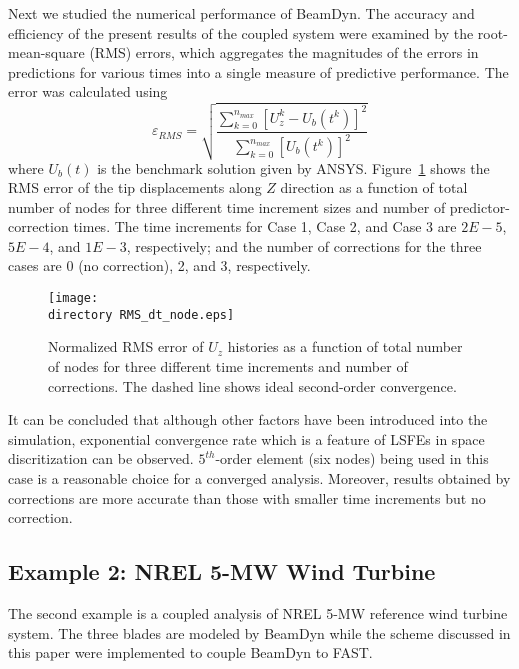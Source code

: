 \documentclass{aiaa-tc}
\def\directory{EPSF/}
\begin{document}
Next we studied the numerical performance of BeamDyn. The accuracy and efficiency of the present results of the coupled system were examined by the root-mean-square (RMS) errors, which aggregates the magnitudes of the errors in predictions for various times into a single measure of predictive performance. The error was calculated using
\begin{equation}
\varepsilon_{RMS}=\sqrt{\frac{\sum_{k=0}^{n_{max}}[U_z^k-U_b(t^k)]^2}{\sum_{k=0}^{n_{max}}[U_b(t^k)]^2}}
\label{RMSdefi}
\end{equation} 
where $U_b(t)$ is the benchmark solution given by ANSYS. Figure~\ref{fig:ConvDTNode} shows the RMS error of the tip displacements along $Z$ direction as a function of total number of nodes for three different time increment sizes and number of predictor-correction times. The time increments for Case 1, Case 2, and Case 3 are $2E-5$, $5E-4$, and $1E-3$, respectively; and the number of corrections for the three cases are 0 (no correction), 2, and 3, respectively.
\begin{figure}
\centering
\texttt{[image: \\directory RMS\_dt\_node.eps]}
\caption{Normalized RMS error of $U_z$ histories as a function of total number of nodes for three different time increments and number of corrections. The dashed line shows ideal second-order convergence.} 
\label{fig:ConvDTNode}
\end{figure}
It can be concluded that although other factors have been introduced into the simulation, exponential convergence rate which is a feature of LSFEs in space discritization can be observed. $5^{th}$-order element (six nodes) being used in this case is a reasonable choice for a converged analysis. Moreover, results obtained by corrections are more accurate than those with smaller time increments but no correction.

\subsection{Example 2: NREL 5-MW Wind Turbine}
The second example is a coupled analysis of NREL 5-MW reference wind turbine system. The three blades are modeled by BeamDyn while the scheme discussed in this paper  were implemented to couple BeamDyn to FAST. 
\end{document}

